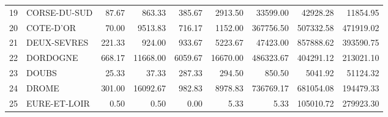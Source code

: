 \documentclass[11pt, a4paper]{article}
\begin{document}
\begin{center}
\begin{table}[ht]
\begin{tabular}{rlrrrrrrr}
\\ 
  19 & CORSE-DU-SUD & 87.67 & 863.33 & 385.67 & 2913.50 & 33599.00 & 42928.28 & 11854.95 \\ 
  20 & COTE-D'OR & 70.00 & 9513.83 & 716.17 & 1152.00 & 367756.50 & 507332.58 & 471919.02 \\ 
  21 & DEUX-SEVRES & 221.33 & 924.00 & 933.67 & 5223.67 & 47423.00 & 857888.62 & 393590.75 \\ 
  22 & DORDOGNE & 668.17 & 11668.00 & 6059.67 & 16670.00 & 486323.67 & 404291.12 & 213021.10 \\ 
  23 & DOUBS & 25.33 & 37.33 & 287.33 & 294.50 & 850.50 & 5041.92 & 51124.32 \\ 
  24 & DROME & 301.00 & 16092.67 & 982.83 & 8978.83 & 736769.17 & 681054.08 & 194479.33 \\ 
  25 & EURE-ET-LOIR & 0.50 & 0.50 & 0.00 & 5.33 & 5.33 & 105010.72 & 279923.30 \\ 


\end{tabular}
\end{table}
\end{center}
\end{document}
